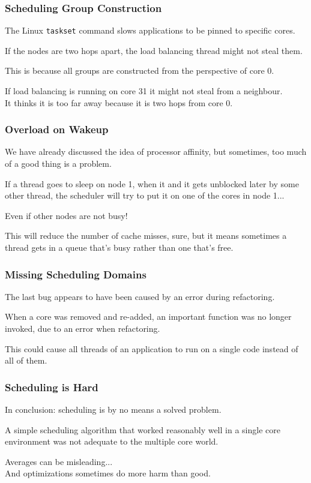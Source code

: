 \begin{frame}
\frametitle{Scheduling Group Construction}

The Linux \texttt{taskset} command slows applications to be pinned to specific cores. 

If the nodes are two hops apart, the load balancing thread might not steal them. 

This is because all groups are constructed from the perspective of core 0. 

If load balancing is running on core 31 it might not steal from a neighbour.\\
\quad It thinks it is too far away because it is two hops from core 0.

\end{frame}



\begin{frame}
\frametitle{Overload on Wakeup}

We have already discussed the idea of processor affinity, but sometimes, too much of a good thing is a problem. 

If a thread goes to sleep on node 1, when it and it gets unblocked later by some other thread, the scheduler will try to put it on one of the cores in node 1... 

Even if other nodes are not busy! 

This will reduce the number of cache misses, sure, but it means sometimes a thread gets in a queue that's busy rather than one that's free.

\end{frame}




\begin{frame}
\frametitle{Missing Scheduling Domains}

The last bug appears to have been caused by an error during refactoring. 

When a core was removed and re-added, an important function was no longer invoked, due to an error when refactoring.

This could cause all threads of an application to run on a single code instead of all of them. 

\end{frame}



\begin{frame}
\frametitle{Scheduling is Hard}

In conclusion: scheduling is by no means a solved problem. 

A simple scheduling algorithm that worked reasonably well in a single core environment was not adequate to the multiple core world. 

Averages can be misleading...\\
\quad And optimizations sometimes do more harm than good. 

\end{frame}



